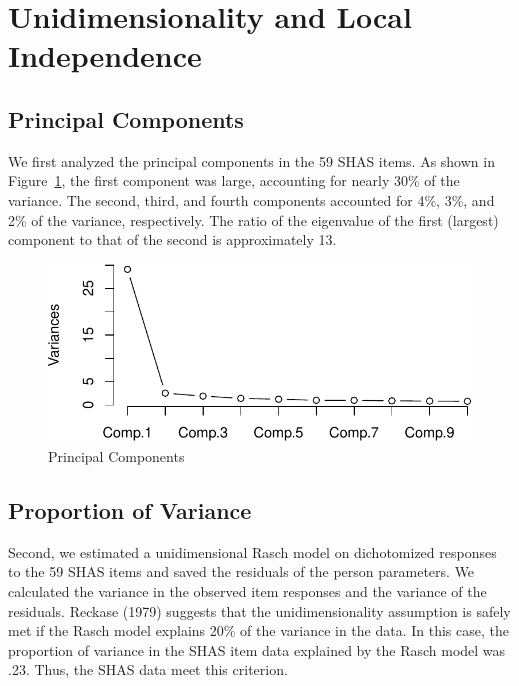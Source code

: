 \documentclass[
  letterpaper,
]{article}
\begin{document}
\hypertarget{unidimensionality-and-local-independence}{%
\section*{Unidimensionality and Local
Independence}\label{unidimensionality-and-local-independence}}

\hypertarget{principal-components}{%
\subsection*{Principal Components}\label{principal-components}}

We first analyzed the principal components in the 59 SHAS items. As
shown in Figure~\ref{fig-pca}, the first component was large, accounting
for nearly 30\% of the variance. The second, third, and fourth
components accounted for 4\%, 3\%, and 2\% of the variance,
respectively. The ratio of the eigenvalue of the first (largest)
component to that of the second is approximately 13.

\begin{figure}

{\centering \includegraphics{./results_files/figure-pdf/fig-pca-1.pdf}

}

\caption{\label{fig-pca}Principal Components}

\end{figure}

\hypertarget{proportion-of-variance}{%
\subsection*{Proportion of Variance}\label{proportion-of-variance}}

Second, we estimated a unidimensional Rasch model on dichotomized
responses to the 59 SHAS items and saved the residuals of the person
parameters. We calculated the variance in the observed item responses
and the variance of the residuals. Reckase (1979) suggests that the
unidimensionality assumption is safely met if the Rasch model explains
20\% of the variance in the data. In this case, the proportion of
variance in the SHAS item data explained by the Rasch model was .23.
Thus, the SHAS data meet this criterion.
\end{document}
